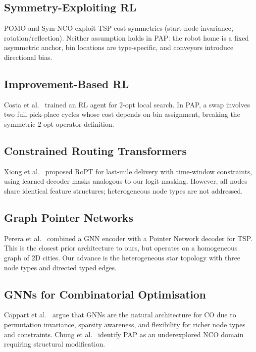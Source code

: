 \documentclass[conference]{IEEEtran}
\begin{document}
\subsection{Symmetry-Exploiting RL}

POMO \cite{kwon2020pomo} and Sym-NCO \cite{kim2022symnco} exploit TSP cost symmetries (start-node invariance, rotation/reflection). Neither assumption holds in PAP: the robot home is a fixed asymmetric anchor, bin locations are type-specific, and conveyors introduce directional bias.

\subsection{Improvement-Based RL}

Costa et al.\ \cite{costa2020learning2opt} trained an RL agent for 2-opt local search. In PAP, a swap involves two full pick-place cycles whose cost depends on bin assignment, breaking the symmetric 2-opt operator definition.

\subsection{Constrained Routing Transformers}

Xiong et al.\ \cite{xiong2025ropt} proposed RoPT for last-mile delivery with time-window constraints, using learned decoder masks analogous to our logit masking. However, all nodes share identical feature structures; heterogeneous node types are not addressed.

\subsection{Graph Pointer Networks}

Perera et al.\ \cite{perera2023gpn} combined a GNN encoder with a Pointer Network decoder for TSP. This is the closest prior architecture to ours, but operates on a homogeneous graph of 2D cities. Our advance is the heterogeneous star topology with three node types and directed typed edges.

\subsection{GNNs for Combinatorial Optimisation}

Cappart et al.\ \cite{cappart2023gnnco} argue that GNNs are the natural architecture for CO due to permutation invariance, sparsity awareness, and flexibility for richer node types and constraints. Chung et al.\ \cite{chung2025ncosurvey} identify PAP as an underexplored NCO domain requiring structural modification.
\end{document}
